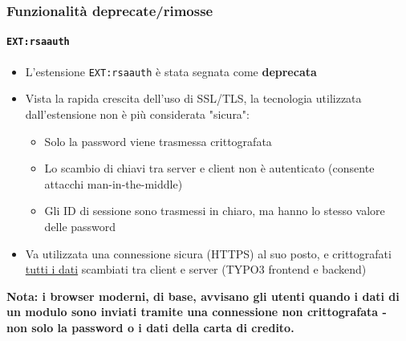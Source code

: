 \begin{frame}[fragile]
	\frametitle{Funzionalità deprecate/rimosse}
	\framesubtitle{\texttt{EXT:rsaauth}}

	\begin{itemize}
		\item L'estensione \texttt{EXT:rsaauth} è stata segnata come \textbf{deprecata}
		\item Vista la rapida crescita dell'uso di SSL/TLS, la tecnologia utilizzata
			dall'estensione non è più considerata "sicura":

			\begin{itemize}
				\item Solo la password viene trasmessa crittografata
				\item Lo scambio di chiavi tra server e client non è autenticato\newline
					(consente attacchi man-in-the-middle)
				\item Gli ID di sessione sono trasmessi in chiaro, ma hanno lo stesso valore
					delle password
			\end{itemize}

		\item Va utilizzata una connessione sicura (HTTPS) al suo posto, e crittografati \underline{tutti i dati}
			scambiati tra client e server (TYPO3 frontend e backend)

	\end{itemize}

	\smaller
		\textbf{Nota: i browser moderni, di base, avvisano gli utenti quando i dati di un modulo sono inviati
			tramite una connessione non crittografata - non solo la password o i dati della carta di credito.}
	\normalsize

\end{frame}

